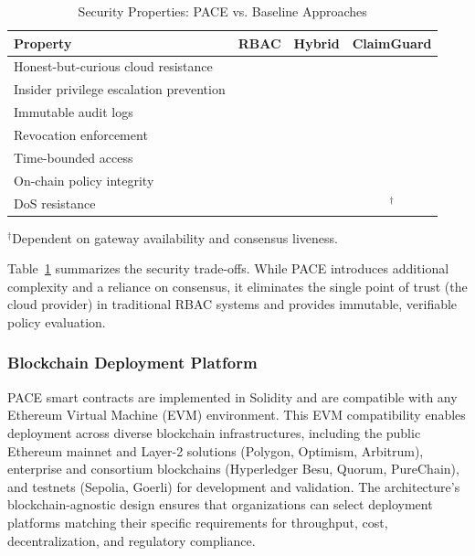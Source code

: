 \documentclass[pdflatex,sn-mathphys-num]{sn-jnl}
\newcommand{\cmark}{\ding{51}}
\newcommand{\xmark}{\ding{55}}
\begin{document}
\begin{table}[!htbp]
	\centering
	\small
	\caption{Security Properties: PACE vs. Baseline Approaches}
	\setlength{\tabcolsep}{3pt}
	\begin{tabular}{@{}p{3.2cm}ccc@{}}
		\toprule
		\textbf{Property}                       & \textbf{RBAC} & \textbf{Hybrid} & \textbf{Claim\-Guard} \\
		\midrule
		Honest-but-curious cloud resistance     & \xmark        & \xmark          & \cmark                \\
		Insider privilege escalation prevention & \xmark        & \xmark          & \cmark                \\
		Immutable audit logs                    & \xmark        & \cmark          & \cmark                \\
		Revocation enforcement                  & \cmark        & \cmark          & \cmark                \\
		Time-bounded access                     & \xmark        & \xmark          & \cmark                \\
		On-chain policy integrity               & \xmark        & \xmark          & \cmark                \\
		DoS resistance                          & \cmark        & \cmark          & \cmark$^{\dagger}$    \\
		\bottomrule
	\end{tabular}

	\footnotesize $^{\dagger}$Dependent on gateway availability and consensus liveness.
	\label{tab:security-comparison}
\end{table}

Table~\ref{tab:security-comparison} summarizes the security trade-offs. While PACE introduces additional complexity and a reliance on consensus, it eliminates the single point of trust (the cloud provider) in traditional RBAC systems and provides immutable, verifiable policy evaluation.

\subsubsection{Blockchain Deployment Platform}

PACE smart contracts are implemented in Solidity and are compatible with any Ethereum Virtual Machine (EVM) environment. This EVM compatibility enables deployment across diverse blockchain infrastructures, including the public Ethereum mainnet and Layer-2 solutions (Polygon, Optimism, Arbitrum), enterprise and consortium blockchains (Hyperledger Besu, Quorum, PureChain), and testnets (Sepolia, Goerli) for development and validation. The architecture's blockchain-agnostic design ensures that organizations can select deployment platforms matching their specific requirements for throughput, cost, decentralization, and regulatory compliance.
\end{document}
